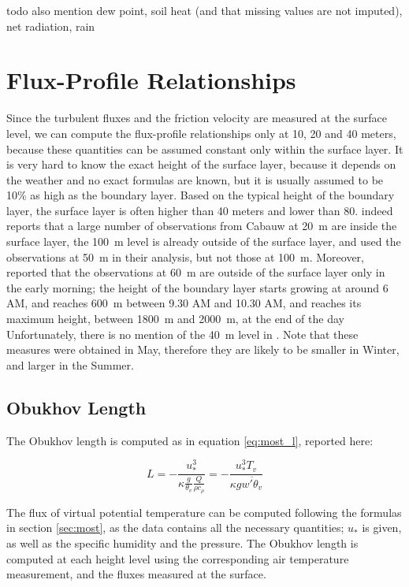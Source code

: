 \documentclass[12pt]{book}
\begin{document}
todo also mention dew point, soil heat (and that missing values are not imputed), net radiation, rain

\section{Flux-Profile Relationships}
\label{sec:profiles}

Since the turbulent fluxes and the friction velocity are measured at the surface level, we can compute the flux-profile relationships only at 10, 20 and 40 meters, because these quantities can be assumed constant only within the surface layer. It is very hard to know the exact height of the surface layer, because it depends on the weather and no exact formulas are known, but it is usually assumed to be 10\% as high as the boundary layer. Based on the typical height of the boundary layer, the surface layer is often higher than 40 meters and lower than 80. \cite{cabauw_z0} indeed reports that a large number of observations from Cabauw at \SI{20}{\meter} are inside the surface layer, the \SI{100}{\meter} level is already outside of the surface layer, and \cite{boulder} used the observations at \SI{50}{\meter} in their analysis, but not those at \SI{100}{\meter}. Moreover, \cite{cabauw60m} reported that the observations at \SI{60}{\meter} are outside of the surface layer only in the early morning; the height of the boundary layer starts growing at around 6 AM, and reaches \SI{600}{\meter} between 9.30 AM and 10.30 AM, and reaches its maximum height, between \SI{1800}{\meter} and \SI{2000}{\meter}, at the end of the day Unfortunately, there is no mention of the \SI{40}{\meter} level in \cite{cabauw60m}. Note that these measures were obtained in May, therefore they are likely to be smaller in Winter, and larger in the Summer.

\subsection{Obukhov Length}

The Obukhov length is computed as in equation \ref{eq:most_l}, reported here:

$$
L=-\frac{u_*^3}{\kappa\frac{g}{\theta_v}\frac{Q}{\rho c_\rho}}
=-\frac{u_*^3 T_v}{\kappa g \overline{w'\theta_v}}
$$

The flux of virtual potential temperature can be computed following the formulas in section \ref{sec:most}, as the data contains all the necessary quantities; $u_*$ is given, as well as the specific humidity and the pressure. The Obukhov length is computed at each height level using the corresponding air temperature measurement, and the fluxes measured at the surface.
\end{document}
